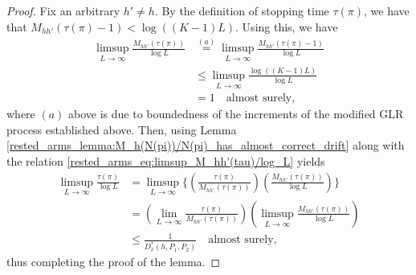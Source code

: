 \begin{proof}
Fix an arbitrary $h'\neq h$. By the definition of stopping time $\tau(\pi)$, we have that $M_{hh'}(\tau(\pi)-1)<\log ((K-1)L)$. Using this, we have
\begingroup\allowdisplaybreaks\begin{align}
	\limsup\limits_{L\to\infty}\frac{M_{hh'}(\tau(\pi))}{\log L}&\stackrel{(a)}{=}\limsup\limits_{L\to\infty}\frac{M_{hh'}(\tau(\pi)-1)}{\log L}\nonumber\\
	&\leq \limsup\limits_{L\to\infty}\frac{\log((K-1)L)}{\log L}\nonumber\\
	&=1\quad \text{almost surely},\label{rested_arms_eq:limsup_M_hh'(tau)/log_L}
\end{align}\endgroup	
where $(a)$ above is due to boundedness of the increments of the modified GLR process established above. Then, using Lemma \ref{rested_arms_lemma:M_h(N(pi))/N(pi)_has_almost_correct_drift} along with the relation \eqref{rested_arms_eq:limsup_M_hh'(tau)/log_L} yields
\begingroup\allowdisplaybreaks\begin{align}
	\limsup\limits_{L\to\infty}\frac{\tau(\pi)}{\log L}&=\limsup\limits_{L\to\infty}\bigg\lbrace\left(\frac{\tau(\pi)}{M_{hh'}(\tau(\pi))}\right)\left(\frac{M_{hh'}(\tau(\pi))}{\log L}\right)\bigg\rbrace \nonumber\\
	&=\left(\lim\limits_{L\to\infty}\frac{\tau(\pi)}{M_{hh'}(\tau(\pi))}\right)\left(\limsup\limits_{L\to\infty}\frac{M_{hh'}(\tau(\pi))}{\log L}\right)\nonumber\\
	&\leq \frac{1}{D_\delta^*(h,P_1,P_2)}\quad \text{almost surely},
\end{align}\endgroup
thus completing the proof of the lemma.
\end{proof}


